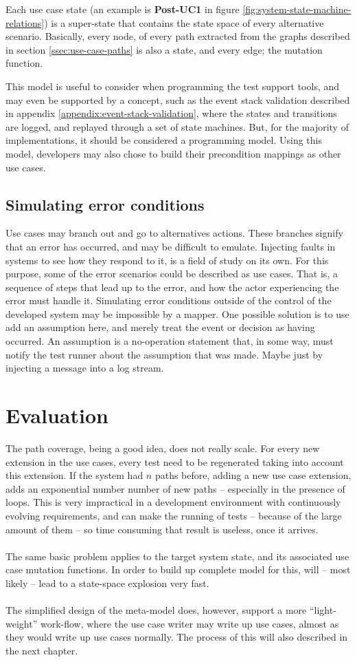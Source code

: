\noindent Each use case state (an example is \textbf{Post-UC1} in figure \ref{fig:system-state-machine-relations}) is a super-state that contains the state space of every alternative scenario. Basically, every node, of every path extracted from the graphs described in section \ref{ssec:use-case-paths} is also a state, and every edge; the mutation function.\medskip

\noindent This model is useful to consider when programming the test support tools, and may even be supported by a concept, such as the event stack validation described in appendix \ref{appendix:event-stack-validation}, where the states and transitions are logged, and replayed through a set of state machines. But, for the majority of implementations, it should be considered a programming model. Using this model, developers may also chose to build their precondition mappings as other use cases.

\subsection{Simulating error conditions}
Use cases may branch out and go to alternatives actions. These branches signify that an error has occurred, and may be difficult to emulate. Injecting faults in systems to see how they respond to it, is a field of study on its own. For this purpose, some of the error scenarios could be described as use cases. That is, a sequence of steps that lead up to the error, and how the actor experiencing the error must handle it. Simulating error conditions outside of the control of the developed system may be impossible by a mapper. One possible solution is to use add an assumption here, and merely treat the event or decision as having occurred. An assumption is a no-operation statement that, in some way, must notify the test runner about the assumption that was made. Maybe just by injecting a message into a log stream.

\section{Evaluation}
The path coverage, being a good idea, does not really scale. For every new extension in the use cases, every test need to be regenerated taking into account this extension. If the system had $n$ paths before, adding a new use case extension, adds an exponential number number of new paths -- especially in the presence of loops. This is very impractical in a development environment with continuously evolving requirements, and can make the running of tests -- because of the large amount of them -- so time consuming that result is useless, once it arrives.\\\\
The same basic problem applies to the target system state, and its associated use case mutation functions. In order to build up complete model for this, will -- most likely -- lead to a state-space explosion very fast.\\\\
The simplified design of the meta-model does, however, support a more ``light-weight'' work-flow, where the use case writer may write up use cases, almost as they would write up use cases normally. The process of this will also described in the next chapter.